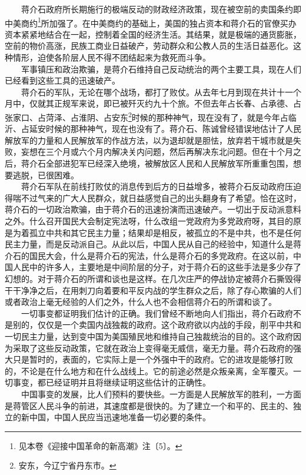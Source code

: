 \documentclass[cn,11pt,chinese]{elegantbook}
\begin{document}
　　蒋介石政府所长期施行的极端反动的财政经济政策，现在被空前的卖国条约即中美商约\footnote[5]{ 见本卷《迎接中国革命的新高潮》注〔5〕。}所加强了。在中美商约的基础上，美国的独占资本和蒋介石的官僚买办资本紧紧地结合在一起，控制着全国的经济生活。其结果，就是极端的通货膨胀，空前的物价高涨，民族工商业日益破产，劳动群众和公教人员的生活日益恶化。这种情形，迫使各阶层人民不得不团结起来为救死而斗争。\\
　　军事镇压和政治欺骗，是蒋介石维持自己反动统治的两个主要工具，现在人们已经看到这些工具的迅速破产。\\
　　蒋介石的军队，无论在哪个战场，都打了败仗。从去年七月到现在共计十一个月中，仅就其正规军来说，即已被歼灭约九十个旅。不但去年占长春、占承德、占张家口、占菏泽、占淮阴、占安东\footnote[6]{ 安东，今辽宁省丹东市。}时候的那种神气，现在没有了，就是今年占临沂、占延安时候的那种神气，现在也没有了。蒋介石、陈诚曾经错误地估计了人民解放军的力量和人民解放军的作战方法，以为退却就是胆怯，放弃若干城市就是失败，妄想在三个月或六个月内解决关内问题，然后再解决东北问题。但在十个月之后，蒋介石全部进犯军已经深入绝境，被解放区人民和人民解放军所重重包围，想要逃脱，已很困难。\\
　　蒋介石军队在前线打败仗的消息传到后方的日益增多，被蒋介石反动政府压迫得喘不过气来的广大人民群众，就日益感觉自己的出头翻身有了希望。恰在这时，蒋介石的一切政治欺骗，由于蒋介石的迅速扮演而迅速破产。一切出于反动派意料之外。什么召开国民大会制定宪法呀，什么改组一党政府为多党政府呀，其目的原是为着孤立中共和其它民主力量；结果却是相反，被孤立的不是中共，也不是任何民主力量，而是反动派自己。从此以后，中国人民从自己的经验中，知道什么是蒋介石的国民大会，什么是蒋介石的宪法，什么是蒋介石的多党政府。在这以前，中国人民中的许多人，主要地是中间阶层的分子，对于蒋介石的这些手法是多少存了幻想的。对于蒋介石的所谓和谈也是这样。在几次庄严的停战协定被蒋介石撕毁得干干净净之后，在用刺刀向着要和平反内战的学生群众之后，除了存心欺骗的人们或者政治上毫无经验的人们之外，什么人也不会相信蒋介石的所谓和谈了。\\
　　一切事变都证明我们估计的正确。我们曾经不断地向人们指出，蒋介石政府不是别的，仅仅是一个卖国内战独裁的政府。这个政府欲以内战的手段，削平中共和一切民主力量，达到变中国为美国殖民地和维持自己独裁统治的目的。这个政府因为采取了这些反动政策，它就在政治上变得毫无威信，毫无力量。蒋介石政府的强大只是暂时的，表面的，它实际上是一个外强中干的政府。它的进攻是能够打败的，不论是在什么地方和在什么战线上。它的前途必然是众叛亲离，全军覆灭。一切事变，都已经证明并且将继续证明这些估计的正确性。\\
　　中国事变的发展，比人们预料的要快些。一方面是人民解放军的胜利，一方面是蒋管区人民斗争的前进，其速度都是很快的。为了建立一个和平的、民主的、独立的新中国，中国人民应当迅速地准备一切必要的条件。\\
\end{document}
